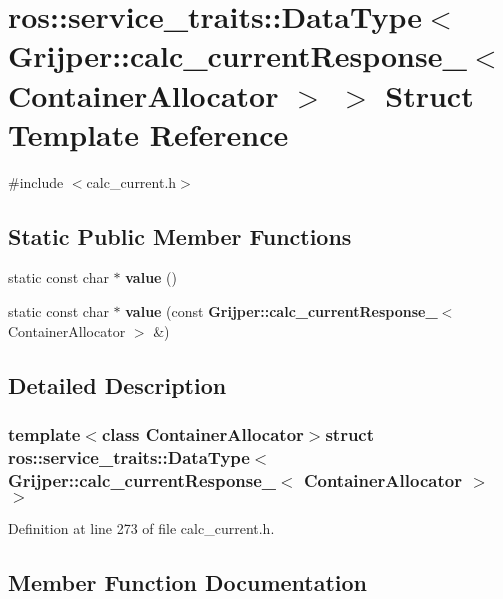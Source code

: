\section{ros\-:\-:service\-\_\-traits\-:\-:Data\-Type$<$ Grijper\-:\-:calc\-\_\-current\-Response\-\_\-$<$ Container\-Allocator $>$ $>$ Struct Template Reference}
\label{structros_1_1service__traits_1_1DataType_3_01Grijper_1_1calc__currentResponse___3_01ContainerAllocator_01_4_01_4}


{\ttfamily \#include $<$calc\-\_\-current.\-h$>$}

\subsection*{Static Public Member Functions}
\begin{DoxyCompactItemize}
\item 
static const char $\ast$ {\bf value} ()
\item 
static const char $\ast$ {\bf value} (const {\bf Grijper\-::calc\-\_\-current\-Response\-\_\-}$<$ Container\-Allocator $>$ \&)
\end{DoxyCompactItemize}


\subsection{Detailed Description}
\subsubsection*{template$<$class Container\-Allocator$>$struct ros\-::service\-\_\-traits\-::\-Data\-Type$<$ Grijper\-::calc\-\_\-current\-Response\-\_\-$<$ Container\-Allocator $>$ $>$}



Definition at line 273 of file calc\-\_\-current.\-h.



\subsection{Member Function Documentation}
